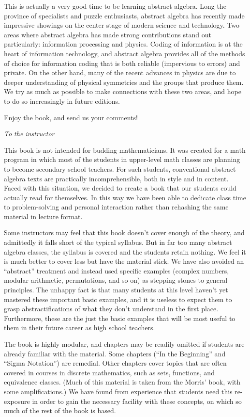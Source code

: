 This is actually a very good time to be learning abstract algebra. Long the province of specialists and puzzle enthusiasts, abstract algebra has recently made  impressive showings on the center stage of modern  science and technology. Two areas where abstract algebra has made strong contributions stand out particularly: information processing and physics. Coding of information is at the heart of information technology, and abstract algebra provides all of the methods of choice for information coding that is both reliable (impervious to errors) and private.  
On the other hand,  many of the recent advances in  physics are due to deeper understanding of physical symmetries and the groups that produce them. We try as much as possible to make connections with these two areas, and hope to do so increasingly in future editions. 

Enjoy the book, and send us your comments!
\medskip

\noindent
\emph{To the instructor}
\smallskip

This book  is not intended for budding mathematicians. It was created for a math program in which most of the students in upper-level math classes are planning to become secondary school teachers. For such students, conventional abstract algebra texts are practically  incomprehensible, both in style and in content. Faced with this situation, we decided to create a book that our students could actually read for themselves. In this way we have been able to dedicate class time to problem-solving and personal  interaction rather than rehashing the same material in lecture format.

Some instructors may feel that this book doesn't cover enough of the theory, and admittedly it falls short of the typical syllabus. But in far too many abstract algebra classes, the syllabus is covered and the students retain nothing. We feel it is much better to cover less but have the material stick. We have also avoided an ``abstract'' treatment and instead used specific examples (complex numbers, modular arithmetic, permutations, and so on) as stepping stones to general principles. The unhappy fact is that many students at this level haven't yet mastered these important basic examples, and it is useless to expect them to grasp abstractifications of what they don’t understand in the first place. Furthermore, these are the just the basic examples that will be most useful to them in their future career as high school teachers.

The book is highly modular, and chapters may be readily omitted if students are already familiar with the material. Some chapters  (``In the Beginning'' and ``Sigma Notation'') are remedial. Other chapters cover topics that are often covered in courses in discrete mathematics, such as sets, functions, and equivalence classes. (Much of this material is taken from the Morris' book, with some amplifications.) We have found from experience that students need this re-exposure in order to gain the necessary facility with these concepts, on which so much of the rest of the book is based.

